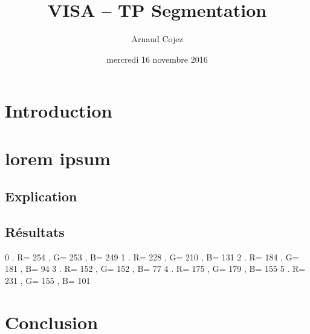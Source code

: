 \documentclass[a4paper]{article}
\begin{document}
\title{VISA -- TP Segmentation}
\author{Arnaud Cojez}
\date{mercredi 16 novembre 2016}

\maketitle

\newpage
\tableofcontents
\newpage

\section{Introduction}

\clearpage

\section{lorem ipsum}

\subsection{Explication}

\subsection{Résultats}

0 . R= 254 , G= 253 , B= 249
1 . R= 228 , G= 210 , B= 131
2 . R= 184 , G= 181 , B= 94
3 . R= 152 , G= 152 , B= 77
4 . R= 175 , G= 179 , B= 155
5 . R= 231 , G= 155 , B= 101

\clearpage

\section{Conclusion}

\clearpage
\end{document}
